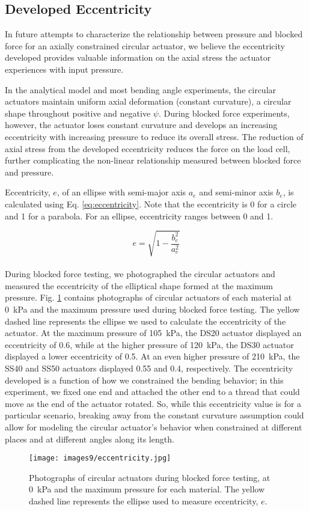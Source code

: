 \clearpage
\subsection{Developed Eccentricity}
\label{section:eccentricity}

In future attempts to characterize the relationship between pressure and blocked force for an axially constrained circular actuator, we believe the eccentricity developed provides valuable information on the axial stress the actuator experiences with input pressure. 

In the analytical model and most bending angle experiments, the circular actuators maintain uniform axial deformation (constant curvature), a circular shape throughout positive and negative $\psi$. During blocked force experiments, however, the actuator loses constant curvature and develops an increasing eccentricity with increasing pressure to reduce its overall stress. The reduction of axial stress from the developed eccentricity reduces the force on the load cell, further complicating the non-linear relationship measured between blocked force and pressure. 

Eccentricity, $e$, of an ellipse with semi-major axis $a_e$ and semi-minor axis $b_e$, is calculated using Eq. \ref{eq:eccentricity}. Note that the eccentricity is 0 for a circle and 1 for a parabola. For an ellipse, eccentricity ranges between 0 and 1. 

\begin{equation}
    e = \sqrt{1-\frac{b_e^2}{a_e^2}}
    \label{eq:eccentricity}
\end{equation}
\\
During blocked force testing, we photographed the circular actuators and measured the eccentricity of the elliptical shape formed at the maximum pressure. Fig. \ref{fig:eccentricity} contains photographs of circular actuators of each material at 0~kPa and the maximum pressure used during blocked force testing. The yellow dashed line represents the ellipse we used to calculate the eccentricity of the actuator. At the maximum pressure of 105~kPa, the DS20 actuator displayed an eccentricity of 0.6, while at the higher pressure of 120~kPa, the DS30 actuator displayed a lower eccentricity of 0.5. At an even higher pressure of 210~kPa, the SS40 and SS50 actuators displayed 0.55 and 0.4, respectively. The eccentricity developed is a function of how we constrained the bending behavior; in this experiment, we fixed one end and attached the other end to a thread that could move as the end of the actuator rotated. So, while this eccentricity value is for a particular scenario, breaking away from the constant curvature assumption could allow for modeling the circular actuator's behavior when constrained at different places and at different angles along its length.
\\
\begin{figure}[ht]
    \centering
     \texttt{[image: images9/eccentricity.jpg]}
    \caption{Photographs of circular actuators during blocked force testing, at 0~kPa and the maximum pressure for each material. The yellow dashed line represents the ellipse used to measure eccentricity, $e$.}
    \label{fig:eccentricity}
\end{figure}